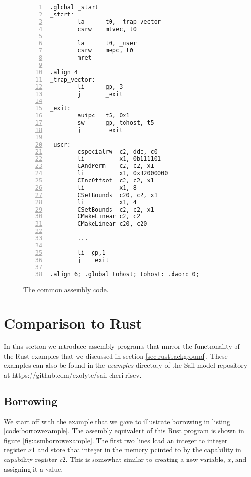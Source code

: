 \begin{figure}[h]
\begin{lstlisting}[style=custASM, numbers = left ,xleftmargin=1.5em]
        .global _start
_start:
        la      t0, _trap_vector
        csrw	mtvec, t0

        la      t0, _user
        csrw    mepc, t0
        mret

.align 4
_trap_vector:
        li      gp, 3
        j       _exit

_exit:
        auipc   t5, 0x1
        sw      gp, tohost, t5
        j       _exit

_user:
        cspecialrw  c2, ddc, c0
        li          x1, 0b111101
        CAndPerm    c2, c2, x1
        li          x1, 0x82000000
        CIncOffset  c2, c2, x1
        li          x1, 8
        CSetBounds  c20, c2, x1
        li          x1, 4
        CSetBounds  c2, c2, x1
        CMakeLinear c2, c2
        CMakeLinear c20, c20
        
        ...
        
        li  gp,1
        j   _exit

.align 6; .global tohost; tohost: .dword 0;
\end{lstlisting}
\caption{The common assembly code.}
\label{fig:commonasm}
\end{figure}

\section{Comparison to Rust}
In this section we introduce assembly programs that mirror the functionality of the Rust examples that we discussed in section \ref{sec:rustbackground}.
These examples can also be found in the \textit{examples} directory of the Sail model repository at \url{https://github.com/exolyte/sail-cheri-riscv}.

\subsection{Borrowing}
We start off with the example that we gave to illustrate borrowing in listing \ref{code:borrowexample}.
The assembly equivalent of this Rust program is shown in figure \ref{fig:asmborrowexample}.
The first two lines load an integer to integer register $x1$ and store that integer in the memory pointed to by the capability in capability register $c2$.
This is somewhat similar to creating a new variable, $x$, and assigning it a value.

